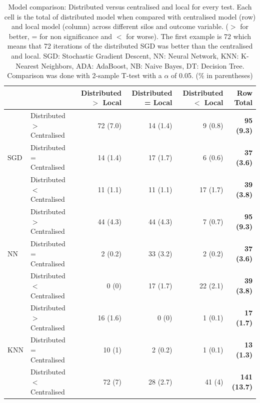 {\small
{} 
 \begin{table}[h] 
 \setlength{\tabcolsep}{6pt} %
 \renewcommand{\arraystretch}{1.1} %
  \captionsetup{justification=centering} 
\centering
\caption[Model comparison: Distributed versus centralised and local for every test]{Model comparison: Distributed versus centralised and local for every test. Each cell is the total of distributed model when compared with centralised model (row) and local model (column) across different silos and outcome variable. ($>$ for better, = for non significance and $<$ for worse). The first example is 72 which means that 72 iterations of the distributed SGD was better than the centralised and local. SGD: Stochastic Gradient Descent, NN: Neural Network, KNN: K-Nearest Neighbors, ADA: AdaBoost, NB: Naive Bayes, DT: Decision Tree. Comparison was done with 2-sample T-test with a $\alpha$ of 0.05. (\% in parentheses)}
\label{tab:hyp}
\begin{tabular}{llrrrr}
\toprule


 &  & Distributed $>$ Local & Distributed = Local & Distributed $<$ Local & \textbf{Row Total} \\


\hline \multirow{3}{*}{SGD} &Distributed $>$ Centralised  & 72 (7.0) & 14 (1.4) & 9 (0.8) & \textbf{95 (9.3)} \\
 & Distributed =  Centralised& 14 (1.4) & 17 (1.7) & 6 (0.6) & \textbf{37 (3.6) } \\
 & Distributed $<$ Centralised  & 11 (1.1) & 11 (1.1) & 17 (1.7) & \textbf{39 (3.8)} \\
\hline \multirow{3}{*}{NN} & Distributed $>$ Centralised & 44 (4.3) & 44 (4.3) & 7 (0.7) & \textbf{95 (9.3)} \\
 & Distributed =  Centralised& 2 (0.2) & 33 (3.2) & 2 (0.2) & \textbf{37 (3.6)} \\
 & Distributed $<$ Centralised & 0 (0) & 17 (1.7) & 22 (2.1) & \textbf{39 (3.8)} \\


\hline \multirow{3}{*}{KNN} & Distributed $>$ Centralised & 16 (1.6) & 0 (0) & 1 (0.1) & \textbf{17 (1.7)} \\
 & Distributed =  Centralised & 10 (1) & 2 (0.2) & 1 (0.1) & \textbf{13 (1.3)} \\
 & Distributed $<$ Centralised & 72 (7)  & 28 (2.7) & 41 (4) & \textbf{141 (13.7)} \\


\end{tabular}
\end{table}}
